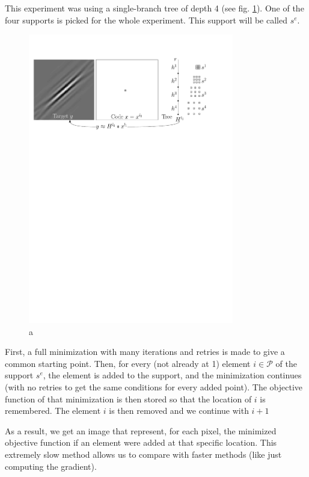 This experiment was using a single-branch tree of depth 4 (see fig. \ref{fig_single_branch}). One of the four supports is picked for the whole experiment. This support will be called $s^e$.
\begin{figure}[!ht]\centering
\includegraphics[width=0.8\textwidth]{figures/xp-pts-worth-adding.pdf}
\caption{a} \label{fig_single_branch}
\end{figure}
First, a full minimization with many iterations and retries is made to give a common starting point. Then, for every (not already at 1) element $i \in \mathcal{P}$  of the support $s^e$, the element is added to the support, and the minimization continues (with no retries to get the same conditions for every added point).
The objective function of that minimization is then stored so that the location of $i$ is remembered. The element $i$ is then removed and we continue with $i+1$ %


As a result, we get an image that represent, for each pixel, the minimized objective function if an element were added at that specific location. This extremely slow method allows us to compare with faster methods (like just computing the gradient).


